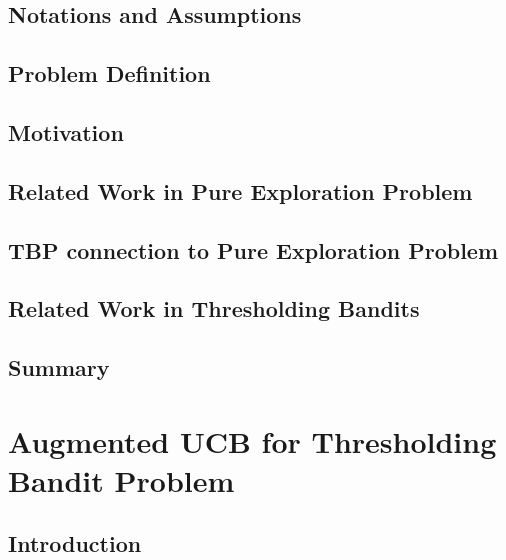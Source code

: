 \documentclass[MS,twoside]{iitmdiss}
\newcommand{\clearemptydoublepage}{\newpage{\cleardoublepage}}
\begin{document}
\section{Notations and Assumptions}
\label{tbandit:notations}


\section{Problem Definition}
\label{tbandit:probDef}


\section{Motivation}
\label{tbandit:motivation}


\section{Related Work in Pure Exploration Problem}
\label{tbandit:prevRes}


\section{TBP connection to Pure Exploration Problem}
\label{tbandit:connection}



\section{Related Work in Thresholding Bandits}
\label{tbandit:prevResAPT}



\section{Summary}
\label{tbandit:conc}







\clearemptydoublepage
\chapter{Augmented UCB for Thresholding Bandit Problem}
\label{chap:tbandit2}

\section{Introduction}
\label{tbandit:intro2}

\end{document}
